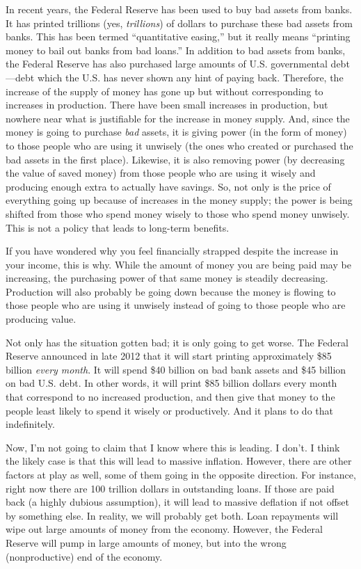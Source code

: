 \documentclass[letterpaper]{article}
\begin{document}
{\color{black}
In recent years, the Federal Reserve has been used to buy bad assets
from banks. It has printed trillions (yes, \textit{trillions}) of
dollars to purchase these bad assets from banks. This has been termed
“quantitative easing,” but it really means “printing money to bail out
banks from bad loans.”  In addition to bad assets from banks, the
Federal Reserve has also purchased large amounts of U.S. governmental
debt—debt which the U.S. has never shown any hint of paying back.
Therefore, the increase of the supply of money has gone up but without
corresponding to increases in production. There have been small
increases in production, but nowhere near what is justifiable for the
increase in money supply. And, since the money is going to purchase
\textit{bad} assets, it is giving power (in the form of money) to those
people who are using it unwisely (the ones who created or purchased the
bad assets in the first place).  Likewise, it is also removing power
(by decreasing the value of saved money) from those people who are
using it wisely \textcolor[rgb]{0.32941177,0.5529412,0.83137256}{and
producing enough extra to actually have
savings}.\textcolor[rgb]{0.32941177,0.5529412,0.83137256}{ } So, not
only is the price of everything going up because of increases in the
money supply; the power is being shifted from those who spend money
wisely to those who spend money unwisely. This is not a policy that
leads to long-term benefits.}

{\color{black}
If you have wondered why you feel financially strapped despite the
increase in your income, this is why. While the amount of money you are
being paid may be increasing, the purchasing power of that same money
is steadily decreasing. Production will also probably be going down
because the money is flowing to those people who are using it unwisely
instead of going to those people who are producing value.}

{\color{black}
Not only has the situation gotten bad; it is only going to get worse.
The Federal Reserve announced in late 2012 that it will start printing
approximately \$85 billion \textit{every month}. It will spend \$40
billion on bad bank assets and \$45 billion on bad U.S. debt. In other
words, it will print \$85 billion dollars every month that correspond
to no increased production, and then give that money to the people
least likely to spend it wisely or productively. And it plans to do
that indefinitely.}

{\color{black}
Now, I’m not going to claim that I know where this is leading. I don’t.
I think the likely case is that this will lead to massive inflation. 
However, there are other factors at play as well, some of them going in
the opposite direction.  For instance, right now there are 100 trillion
dollars in outstanding loans. If those are paid back (a highly dubious
assumption), it will lead to massive deflation if not offset by
something else.  In reality, we will probably get both. Loan repayments
will wipe out large amounts of money from the economy.  However, the
Federal Reserve will pump in large amounts of money, but into the wrong
(nonproductive) end of the economy.  }
\end{document}
